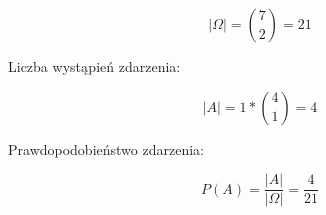 \medskip
{} 
\medskip

$$ |\Omega|= \binom{7}{2}=21 $$

Liczba wystąpień zdarzenia:

$$ |A| = 1* \binom{4}{1}=4 $$

Prawdopodobieństwo zdarzenia:

$$ P(A)=\frac{|A|}{|\Omega|}=\frac{4}{21} $$
